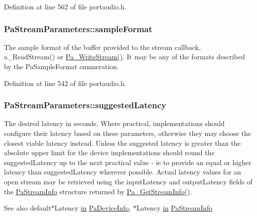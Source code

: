 Definition at line 562 of file portaudio.\+h.

\subsubsection[{\texorpdfstring{sample\+Format}{sampleFormat}}]{ Pa\+Stream\+Parameters\+::sample\+Format}\hypertarget{struct_pa_stream_parameters_ad8d2d3063757b812f9e5f8709f41052b}{}\label{struct_pa_stream_parameters_ad8d2d3063757b812f9e5f8709f41052b}
The sample format of the buffer provided to the stream callback, a\+\_\+\+Read\+Stream() or \hyperlink{portaudio_8h_a075a6efb503a728213bdae24347ed27d}{Pa\+\_\+\+Write\+Stream()}. It may be any of the formats described by the Pa\+Sample\+Format enumeration. 

Definition at line 542 of file portaudio.\+h.

\subsubsection[{\texorpdfstring{suggested\+Latency}{suggestedLatency}}]{ Pa\+Stream\+Parameters\+::suggested\+Latency}\hypertarget{struct_pa_stream_parameters_aa1e80ac0551162fd091db8936ccbe9a0}{}\label{struct_pa_stream_parameters_aa1e80ac0551162fd091db8936ccbe9a0}
The desired latency in seconds. Where practical, implementations should configure their latency based on these parameters, otherwise they may choose the closest viable latency instead. Unless the suggested latency is greater than the absolute upper limit for the device implementations should round the suggested\+Latency up to the next practical value -\/ ie to provide an equal or higher latency than suggested\+Latency wherever possible. Actual latency values for an open stream may be retrieved using the input\+Latency and output\+Latency fields of the \hyperlink{struct_pa_stream_info}{Pa\+Stream\+Info} structure returned by \hyperlink{portaudio_8h_a3d9c4cbda4e9f381b76f287c3de8a758}{Pa\+\_\+\+Get\+Stream\+Info()}. \begin{DoxySeeAlso}{See also}
default$\ast$\+Latency \hyperlink{latency_8c_a7d946209d777cb95fe30364b8d321207}{in} \hyperlink{struct_pa_device_info}{Pa\+Device\+Info}, $\ast$\+Latency \hyperlink{latency_8c_a7d946209d777cb95fe30364b8d321207}{in} \hyperlink{struct_pa_stream_info}{Pa\+Stream\+Info} 
\end{DoxySeeAlso}


